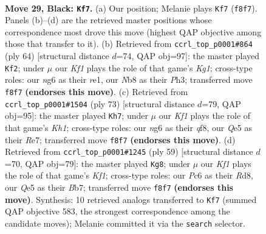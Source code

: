 \documentclass[11pt]{article}
\begin{document}
\clearpage

\begin{figure}[p]\centering
\begin{subfigure}{0.46\textwidth}\centering
\resizebox{\linewidth}{!}{%
\newchessgame
\chessboard[
  setfen={rnb2k2/p7/2p1p1N1/P1Ppq1P1/1P6/2P5/5K2/R1B5 b - - 0 29},
  showmover=false,
  pgfstyle=straightmove, color=movearrow, markmove={f8-f7}
]}
\caption{}
\end{subfigure}\hfill
\begin{subfigure}{0.46\textwidth}\centering
\resizebox{\linewidth}{!}{%
\newchessgame
\chessboard[
  setfen={2r3k1/5pp1/p6p/2np1Q2/P2N4/5P1P/2P3P1/4r1K1 w - - 0 33},
  showmover=false,
  pgfstyle=straightmove, color=movearrow, markmove={g1-f2}
]}
\caption{}
\end{subfigure}
\\[4pt]
\begin{subfigure}{0.46\textwidth}\centering
\resizebox{\linewidth}{!}{%
\newchessgame
\chessboard[
  setfen={5Q1k/1p2r3/p1p1P2p/3p2q1/PP5p/7P/4R1P1/6K1 b - - 2 37},
  showmover=false,
  pgfstyle=straightmove, color=movearrow, markmove={h8-h7}
]}
\caption{}
\end{subfigure}\hfill
\begin{subfigure}{0.46\textwidth}\centering
\resizebox{\linewidth}{!}{%
\newchessgame
\chessboard[
  setfen={3r1k2/1b3p2/p4n1Q/1p2qB2/2p5/P1N4P/1P4P1/5R1K b - - 4 30},
  showmover=false,
  pgfstyle=straightmove, color=movearrow, markmove={f8-g8}
]}
\caption{}
\end{subfigure}
\caption{\textbf{Move 29, Black: \texttt{Kf7}.} (a) Our position; Melanie plays \texttt{Kf7} (\texttt{f8f7}). Panels (b)--(d) are the retrieved master positions whose correspondence most drove this move (highest QAP objective among those that transfer to it). (b) Retrieved from \texttt{ccrl\_top\_p0001\#864} (ply 64) [structural distance $d$=74, QAP obj=97]: the master played \texttt{Kf2}; under $\mu$ our \emph{Kf1} plays the role of that game's \emph{Kg1}; cross-type roles: our \emph{n}g6 as their \emph{r}e1, our \emph{N}b8 as their \emph{P}h3; transferred move \texttt{f8f7} \textbf{(endorses this move)}. (c) Retrieved from \texttt{ccrl\_top\_p0001\#1504} (ply 73) [structural distance $d$=79, QAP obj=95]: the master played \texttt{Kh7}; under $\mu$ our \emph{Kf1} plays the role of that game's \emph{Kh1}; cross-type roles: our \emph{n}g6 as their \emph{q}f8, our \emph{Q}e5 as their \emph{R}e7; transferred move \texttt{f8f7} \textbf{(endorses this move)}. (d) Retrieved from \texttt{ccrl\_top\_p0001\#1245} (ply 59) [structural distance $d$=70, QAP obj=79]: the master played \texttt{Kg8}; under $\mu$ our \emph{Kf1} plays the role of that game's \emph{Kf1}; cross-type roles: our \emph{P}c6 as their \emph{R}d8, our \emph{Q}e5 as their \emph{B}b7; transferred move \texttt{f8f7} \textbf{(endorses this move)}. Synthesis: 10 retrieved analogs transferred to \texttt{Kf7} (summed QAP objective 583, the strongest correspondence among the candidate moves); Melanie committed it via the \texttt{search} selector.}
\label{fig:thought-m57}
\end{figure}
\end{document}
